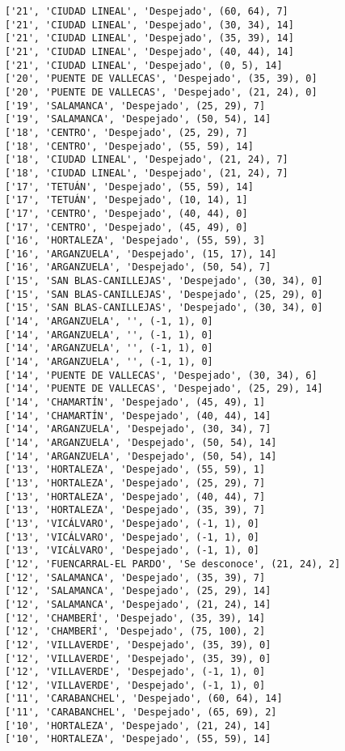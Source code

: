 \documentclass[11pt]{article}
\begin{document}
\begin{Verbatim}[commandchars=\\\{\}]
['21', 'CIUDAD LINEAL', 'Despejado', (60, 64), 7]
['21', 'CIUDAD LINEAL', 'Despejado', (30, 34), 14]
['21', 'CIUDAD LINEAL', 'Despejado', (35, 39), 14]
['21', 'CIUDAD LINEAL', 'Despejado', (40, 44), 14]
['21', 'CIUDAD LINEAL', 'Despejado', (0, 5), 14]
['20', 'PUENTE DE VALLECAS', 'Despejado', (35, 39), 0]
['20', 'PUENTE DE VALLECAS', 'Despejado', (21, 24), 0]
['19', 'SALAMANCA', 'Despejado', (25, 29), 7]
['19', 'SALAMANCA', 'Despejado', (50, 54), 14]
['18', 'CENTRO', 'Despejado', (25, 29), 7]
['18', 'CENTRO', 'Despejado', (55, 59), 14]
['18', 'CIUDAD LINEAL', 'Despejado', (21, 24), 7]
['18', 'CIUDAD LINEAL', 'Despejado', (21, 24), 7]
['17', 'TETUÁN', 'Despejado', (55, 59), 14]
['17', 'TETUÁN', 'Despejado', (10, 14), 1]
['17', 'CENTRO', 'Despejado', (40, 44), 0]
['17', 'CENTRO', 'Despejado', (45, 49), 0]
['16', 'HORTALEZA', 'Despejado', (55, 59), 3]
['16', 'ARGANZUELA', 'Despejado', (15, 17), 14]
['16', 'ARGANZUELA', 'Despejado', (50, 54), 7]
['15', 'SAN BLAS-CANILLEJAS', 'Despejado', (30, 34), 0]
['15', 'SAN BLAS-CANILLEJAS', 'Despejado', (25, 29), 0]
['15', 'SAN BLAS-CANILLEJAS', 'Despejado', (30, 34), 0]
['14', 'ARGANZUELA', '', (-1, 1), 0]
['14', 'ARGANZUELA', '', (-1, 1), 0]
['14', 'ARGANZUELA', '', (-1, 1), 0]
['14', 'ARGANZUELA', '', (-1, 1), 0]
['14', 'PUENTE DE VALLECAS', 'Despejado', (30, 34), 6]
['14', 'PUENTE DE VALLECAS', 'Despejado', (25, 29), 14]
['14', 'CHAMARTÍN', 'Despejado', (45, 49), 1]
['14', 'CHAMARTÍN', 'Despejado', (40, 44), 14]
['14', 'ARGANZUELA', 'Despejado', (30, 34), 7]
['14', 'ARGANZUELA', 'Despejado', (50, 54), 14]
['14', 'ARGANZUELA', 'Despejado', (50, 54), 14]
['13', 'HORTALEZA', 'Despejado', (55, 59), 1]
['13', 'HORTALEZA', 'Despejado', (25, 29), 7]
['13', 'HORTALEZA', 'Despejado', (40, 44), 7]
['13', 'HORTALEZA', 'Despejado', (35, 39), 7]
['13', 'VICÁLVARO', 'Despejado', (-1, 1), 0]
['13', 'VICÁLVARO', 'Despejado', (-1, 1), 0]
['13', 'VICÁLVARO', 'Despejado', (-1, 1), 0]
['12', 'FUENCARRAL-EL PARDO', 'Se desconoce', (21, 24), 2]
['12', 'SALAMANCA', 'Despejado', (35, 39), 7]
['12', 'SALAMANCA', 'Despejado', (25, 29), 14]
['12', 'SALAMANCA', 'Despejado', (21, 24), 14]
['12', 'CHAMBERÍ', 'Despejado', (35, 39), 14]
['12', 'CHAMBERÍ', 'Despejado', (75, 100), 2]
['12', 'VILLAVERDE', 'Despejado', (35, 39), 0]
['12', 'VILLAVERDE', 'Despejado', (35, 39), 0]
['12', 'VILLAVERDE', 'Despejado', (-1, 1), 0]
['12', 'VILLAVERDE', 'Despejado', (-1, 1), 0]
['11', 'CARABANCHEL', 'Despejado', (60, 64), 14]
['11', 'CARABANCHEL', 'Despejado', (65, 69), 2]
['10', 'HORTALEZA', 'Despejado', (21, 24), 14]
['10', 'HORTALEZA', 'Despejado', (55, 59), 14]

\end{Verbatim}
\end{document}
